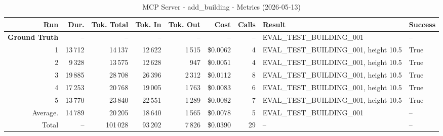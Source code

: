 \documentclass[a4paper,11pt]{article}
\begin{document}
\begin{table}[ht]
\centering
\scriptsize
\caption{MCP Server - add\_building - Metrics (2026-05-13)}
\label{tab:mcp\_add\_building\_metrics\_2026-05-13}
\begin{tabular}{r r r r r r r p{3cm} l}
\hline
Run & Dur. & Tok. Total & Tok. In & Tok. Out & Cost & Calls & Result & Success \\
\hline
\textbf{Ground Truth} & -- & -- & -- & -- & -- & -- & EVAL\_TEST\_BUILDING\_001 & -- \\
\hline
1 & 13\,712 & 14\,137 & 12\,622 & 1\,515 & \$0.0062 & 4 & EVAL\_TEST\_BUILDING\_001, height 10.5 & True \\
2 & 9\,328 & 13\,575 & 12\,628 & 947 & \$0.0051 & 4 & EVAL\_TEST\_BUILDING\_001, height 10.5 & True \\
3 & 19\,885 & 28\,708 & 26\,396 & 2\,312 & \$0.0112 & 8 & EVAL\_TEST\_BUILDING\_001, height 10.5 & True \\
4 & 17\,253 & 20\,768 & 19\,005 & 1\,763 & \$0.0083 & 6 & EVAL\_TEST\_BUILDING\_001, height 10.5 & True \\
5 & 13\,770 & 23\,840 & 22\,551 & 1\,289 & \$0.0082 & 7 & EVAL\_TEST\_BUILDING\_001, height 10.5 & True \\
\hline
Average. & 14\,789 & 20\,205 & 18\,640 & 1\,565 & \$0.0078 & 5 & EVAL\_TEST\_BUILDING\_001 & -- \\
Total & -- & 101\,028 & 93\,202 & 7\,826 & \$0.0390 & 29 & -- & -- \\
\hline
\end{tabular}
\end{table}

\clearpage
\end{document}
